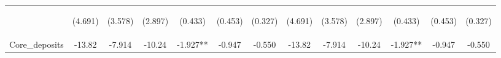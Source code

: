 \documentclass[]{article}
\begin{document}
\begin{center}
\begin{tabular}{lcccccccccccc}
\vspace{4pt} & \begin{footnotesize}(4.691)\end{footnotesize} & \begin{footnotesize}(3.578)\end{footnotesize} & \begin{footnotesize}(2.897)\end{footnotesize} & \begin{footnotesize}(0.433)\end{footnotesize} & \begin{footnotesize}(0.453)\end{footnotesize} & \begin{footnotesize}(0.327)\end{footnotesize} & \begin{footnotesize}(4.691)\end{footnotesize} & \begin{footnotesize}(3.578)\end{footnotesize} & \begin{footnotesize}(2.897)\end{footnotesize} & \begin{footnotesize}(0.433)\end{footnotesize} & \begin{footnotesize}(0.453)\end{footnotesize} & \begin{footnotesize}(0.327)\end{footnotesize} \\
Core\_deposits & -13.82 & -7.914 & -10.24 & -1.927** & -0.947 & -0.550 & -13.82 & -7.914 & -10.24 & -1.927** & -0.947 & -0.550 \\

\end{tabular}
\end{center}
\end{document}
